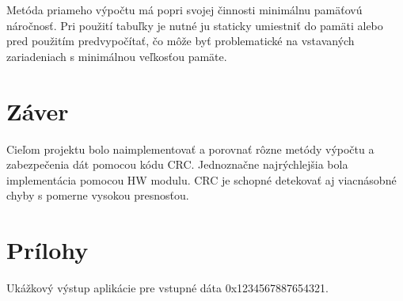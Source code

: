 \documentclass[11pt,a4paper]{article}
\begin{document}
\noindent Metóda priameho výpočtu má popri svojej činnosti minimálnu pamäťovú náročnosť. Pri použití tabuľky je nutné ju staticky umiestniť do pamäti alebo pred použitím predvypočítať, čo môže byť problematické na vstavaných zariadeniach s minimálnou veľkosťou pamäte.


\section{Záver}

Cieľom projektu bolo naimplementovať a porovnať rôzne metódy výpočtu a zabezpečenia dát pomocou kódu CRC. Jednoznačne najrýchlejšia bola implementácia pomocou HW modulu. CRC je schopné detekovať aj viacnásobné chyby s pomerne vysokou presnosťou.

\newpage
\section{Prílohy}
Ukážkový výstup aplikácie pre vstupné dáta 0x1234567887654321.
\end{document}
